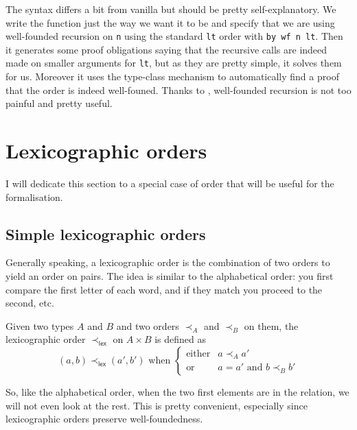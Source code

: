 The syntax differs a bit from vanilla \Coq but should be pretty
self-explanatory. We write the function just the way we want it to be and
specify that we are using well-founded recursion on \texttt{n}
using the standard \texttt{lt} order with \texttt{by wf n lt}.
Then it generates some proof obligations saying that the recursive calls are
indeed made on smaller arguments for \texttt{lt}, but as they are
pretty simple, it solves them for us.
Moreover it uses the type-class mechanism to automatically find a proof that
the order is indeed well-founed.
Thanks to \Equations, well-founded recursion is not too painful and pretty
useful.

\section{Lexicographic orders}

I will dedicate this section to a special case of order that will be useful for
the formalisation.

\subsection{Simple lexicographic orders}

Generally speaking, a lexicographic order is the combination of two orders to
yield an order on pairs. The idea is similar to the alphabetical order:
you first compare the first letter of each word, and if they match you
proceed to the second, etc.

\begin{definition}
  Given two types \(A\) and \(B\) and two orders \(\prec_A\) and \(\prec_B\)
  on them, the lexicographic order \(\prec_{\mathsf{lex}}\) on \(A \times B\)
  is defined as
  \[
    (a,b) \prec_{\mathsf{lex}} (a',b')
    \text{ when }
    \left\{
    \begin{array}{ll}
      \text{either} & a \prec_A a' \\
      \text{or} & a = a' \text{ and } b \prec_B b'
    \end{array}
    \right.
  \]
\end{definition}

So, like the alphabetical order, when the two first elements are in the
relation, we will not even look at the rest.
This is pretty convenient, especially since lexicographic orders preserve
well-foundedness.

